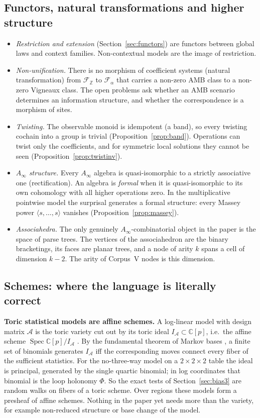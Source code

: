 \documentclass[11pt]{article}
\theoremstyle{definition}
\theoremstyle{remark}
\newcommand{\Z}{\mathbb{Z}}
\begin{document}
\subsection{Functors, natural transformations and higher structure}
\begin{itemize}
  \item \emph{Restriction and extension} (Section~\ref{sec:functors}) are functors between global laws and context families. Non-contextual models are the image of restriction.
  \item \emph{Non-unification.} There is no morphism of coefficient systems (natural transformation) from $\mathcal F_{\Z}$ to $\mathcal F_\alpha$ that carries a non-zero AMB class to a non-zero Vigneaux class. The open problems ask whether an AMB scenario determines an information structure, and whether the correspondence is a morphism of sites.
  \item \emph{Twisting.} The observable monoid is idempotent (a band), so every twisting cochain into a group is trivial (Proposition~\ref{prop:band}). Operations can twist only the coefficients, and for symmetric local solutions they cannot be seen (Proposition~\ref{prop:twistinv}).
  \item \emph{$A_\infty$ structure.} Every $A_\infty$ algebra is quasi-isomorphic to a strictly associative one (rectification). An algebra is \emph{formal} when it is quasi-isomorphic to its own cohomology with all higher operations zero. In the multiplicative pointwise model the surprisal generates a formal structure: every Massey power $\langle s,\dots,s\rangle$ vanishes (Proposition~\ref{prop:massey}).
  \item \emph{Associahedra.} The only genuinely $A_\infty$-combinatorial object in the paper is the space of parse trees. The vertices of the associahedron are the binary bracketings, its faces are planar trees, and a node of arity $k$ spans a cell of dimension $k-2$. The arity of Corpus~V nodes is this dimension.
\end{itemize}

\subsection{Schemes: where the language is literally correct}
\textbf{Toric statistical models are affine schemes.} A log-linear model with design matrix $\mathcal A$ is the toric variety cut out by its toric ideal $I_{\mathcal A}\subset\mathbb{C}[p]$, i.e.\ the affine scheme $\operatorname{Spec}\mathbb{C}[p]/I_{\mathcal A}$ \cite{dss}. By the fundamental theorem of Markov bases \cite{diaconis}, a finite set of binomials generates $I_{\mathcal A}$ iff the corresponding moves connect every fiber of the sufficient statistics. For the no-three-way model on a $2\times2\times2$ table the ideal is principal, generated by the single quartic binomial; in log coordinates that binomial is the loop holonomy $\Phi$. So the exact tests of Section~\ref{sec:bias3} are random walks on fibers of a toric scheme. Over regions these models form a presheaf of affine schemes. Nothing in the paper yet needs more than the variety, for example non-reduced structure or base change of the model.
\end{document}
